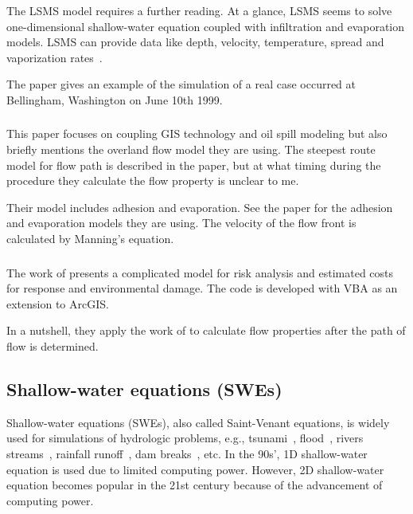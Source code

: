 \documentclass[letterpaper]{article}
\begin{document}
The LSMS model requires a further reading. At a glance, LSMS seems to solve 
one-dimensional shallow-water equation coupled with infiltration and evaporation
models. LSMS can provide data like depth, velocity, temperature, spread and 
vaporization rates\ \cite{Ronnie2004}.

The paper gives an example of the simulation of a real case occurred at 
Bellingham, Washington on June 10th 1999.

\subsubsection{\textcite{Farrar2005}}

This paper focuses on coupling GIS technology and oil spill modeling but also 
briefly mentions the overland flow model they are using. 
The steepest route model for flow path is described in the paper, but at what 
timing during the procedure they calculate the flow property is unclear to me.

Their model includes adhesion and evaporation. 
See the paper for the adhesion and evaporation models they are using.
The velocity of the flow front is calculated by Manning's equation.

\subsubsection{\textcite{Zuczek2008}}

The work of \textcite{Zuczek2008} presents a complicated model for risk analysis
and estimated costs for response and environmental damage. The code is developed
with VBA as an extension to ArcGIS.

In a nutshell, they apply the work of \textcite{Hussein2002} to calculate flow 
properties after the path of flow is determined.

\subsection{Shallow-water equations (SWEs)}

Shallow-water equations (SWEs), also called Saint-Venant equations, is widely 
used for simulations of hydrologic problems, e.g., tsunami\ \cite{Arcos2015}, 
flood\ \cite{Bates2000, Zhang2007, Hunter2007}, 
rivers streams\ \cite{Gouta2002, Burguete2004}, 
rainfall runoff\ \cite{Esteves2000}, 
dam breaks\ \cite{Xanthopoulos1976, Brufau2000}, etc. 
In the 90s', 1D shallow-water equation is used due to limited computing power. 
However, 2D shallow-water equation becomes popular in the 21st century because of 
the advancement of computing power.
\end{document}
